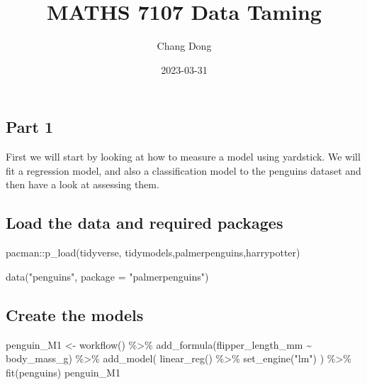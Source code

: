 \documentclass[
]{article}
\title{MATHS 7107 Data Taming}
\author{Chang Dong}
\date{2023-03-31}
\newenvironment{Shaded}{\begin{snugshade}}{\end{snugshade}}
\newcommand{\AttributeTok}[1]{\textcolor[rgb]{0.77,0.63,0.00}{#1}}
\newcommand{\FunctionTok}[1]{\textcolor[rgb]{0.00,0.00,0.00}{#1}}
\newcommand{\NormalTok}[1]{#1}
\newcommand{\OtherTok}[1]{\textcolor[rgb]{0.56,0.35,0.01}{#1}}
\newcommand{\SpecialCharTok}[1]{\textcolor[rgb]{0.00,0.00,0.00}{#1}}
\newcommand{\StringTok}[1]{\textcolor[rgb]{0.31,0.60,0.02}{#1}}
\begin{document}
\maketitle

\hypertarget{part-1}{%
\subsection{Part 1}\label{part-1}}

First we will start by looking at how to measure a model using
yardstick. We will fit a regression model, and also a classification
model to the penguins dataset and then have a look at assessing them.

\hypertarget{load-the-data-and-required-packages}{%
\subsection{Load the data and required
packages}\label{load-the-data-and-required-packages}}

\begin{Shaded}
\begin{Highlighting}[]
\NormalTok{pacman}\SpecialCharTok{::}\FunctionTok{p\_load}\NormalTok{(tidyverse, tidymodels,palmerpenguins,harrypotter)}

\FunctionTok{data}\NormalTok{(}\StringTok{"penguins"}\NormalTok{, }\AttributeTok{package =} \StringTok{"palmerpenguins"}\NormalTok{)}
\end{Highlighting}
\end{Shaded}

\hypertarget{create-the-models}{%
\subsection{Create the models}\label{create-the-models}}

\begin{Shaded}
\begin{Highlighting}[]
\NormalTok{penguin\_M1 }\OtherTok{\textless{}{-}} \FunctionTok{workflow}\NormalTok{() }\SpecialCharTok{\%\textgreater{}\%} 
  \FunctionTok{add\_formula}\NormalTok{(flipper\_length\_mm }\SpecialCharTok{\textasciitilde{}}\NormalTok{ body\_mass\_g) }\SpecialCharTok{\%\textgreater{}\%} 
  \FunctionTok{add\_model}\NormalTok{( }\FunctionTok{linear\_reg}\NormalTok{() }\SpecialCharTok{\%\textgreater{}\%} \FunctionTok{set\_engine}\NormalTok{(}\StringTok{"lm"}\NormalTok{) ) }\SpecialCharTok{\%\textgreater{}\%} 
  \FunctionTok{fit}\NormalTok{(penguins) }
\NormalTok{penguin\_M1}
\end{Highlighting}
\end{Shaded}
\end{document}
